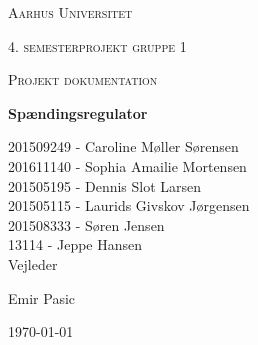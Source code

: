 \thispagestyle{empty}
{\centering
	{\scshape\LARGE Aarhus Universitet \par}
	\vspace{1cm}
	{\scshape\Large 4. semesterprojekt gruppe 1\par}
	{\scshape\Large Projekt dokumentation\par}
	\vspace{1.5cm}
	{\huge\bfseries Spændingsregulator\par}
	\vspace{2cm}
	{\Large
		201509249 - Caroline Møller Sørensen\\
		201611140 - Sophia Amailie Mortensen\\
		201505195 - Dennis Slot Larsen \\
		201505115 - Laurids Givskov Jørgensen\\
		201508333 - Søren Jensen\\
		13114 - Jeppe Hansen\\  }
	\vfill
	Vejleder\par
	Emir Pasic
	
	\vfill
	
	{\large \today\par}
	\par}



